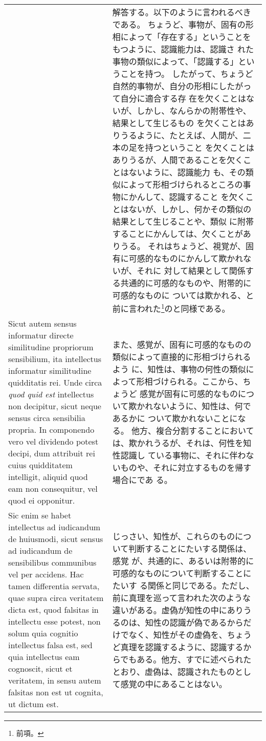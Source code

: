 \documentclass[10pt]{jsarticle} %
\begin{document}
\begin{longtable}{p{21em}p{21em}}
&

解答する。以下のように言われるべきである。
ちょうど、事物が、固有の形相によって「存在する」ということをもつように、認識能力は、認識さ
 れた事物の類似によって、「認識する」ということを持つ。
したがって、ちょうど自然的事物が、自分の形相にしたがって自分に適合する存
 在を欠くことはないが、しかし、なんらかの附帯性や、結果として生じるもの
 を欠くことはありうるように、たとえば、人間が、二本の足を持つということ
 を欠くことはありうるが、人間であることを欠くことはないように、認識能力
 も、その類似によって形相づけられるところの事物にかんして、認識すること
 を欠くことはないが、しかし、何かその類似の結果として生じることや、類似
 に附帯することにかんしては、欠くことがありうる。
それはちょうど、視覚が、固有に可感的なものにかんして欺かれないが、それに
 対して結果として関係する共通的に可感的なものや、附帯的に可感的なものに
 ついては欺かれる、と前に言われた\footnote{前項。}のと同様である。

\\


Sicut
autem sensus informatur directe similitudine propriorum sensibilium, ita
intellectus informatur similitudine quidditatis rei. Unde circa {\itshape quod
quid est} intellectus non decipitur, sicut neque sensus circa sensibilia
propria. 
In componendo vero vel dividendo potest decipi, dum attribuit
rei cuius quidditatem intelligit, aliquid quod eam non consequitur, vel
quod ei opponitur. 


&


また、感覚が、固有に可感的なものの類似によって直接的に形相づけられるよう
 に、知性は、事物の何性の類似によって形相づけられる。ここから、ちょうど
 感覚が固有に可感的なものについて欺かれないように、知性は、何であるかに
 ついて欺かれないことになる。
他方、複合分割することにおいては、欺かれうるが、それは、何性を知性認識し
 ている事物に、それに伴わないものや、それに対立するものを帰す場合にであ
 る。



\\

Sic enim se habet intellectus ad iudicandum de
huiusmodi, sicut sensus ad iudicandum de sensibilibus communibus vel per
accidens. Hac tamen differentia servata, quae supra circa veritatem
dicta est, quod falsitas in intellectu esse potest, non solum quia
cognitio intellectus falsa est, sed quia intellectus eam cognoscit,
sicut et veritatem, in sensu autem falsitas non est ut cognita, ut
dictum est. 


&

じっさい、知性が、これらのものについて判断することにたいする関係は、感覚
 が、共通的に、あるいは附帯的に可感的なものについて判断することにたいす
 る関係と同じである。ただし、前に真理を巡って言われた次のような違いがある。虚偽が知性の中にありうるのは、知性の認識が偽であるからだけでなく、知性がその虚偽を、ちょうど真理を認識するように、認識するからでもある。他方、すでに述べられたとおり、虚偽は、認識されたものとして感覚の中にあることはない。


\end{longtable}
\end{document}
